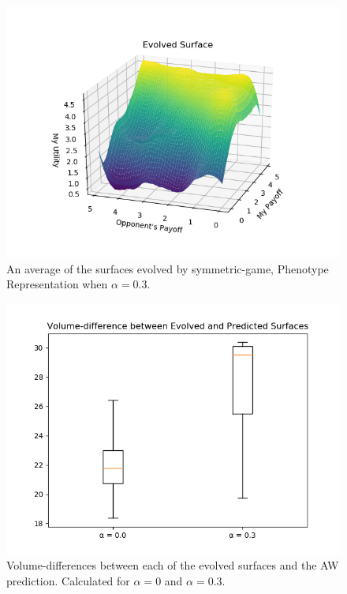 \documentclass[11pt]{book}
\begin{document}
\begin{figure}
	\centering
	\includegraphics[scale=0.7]{resources/average_r_03_symmetric_evolved.png}
	\caption{An average of the surfaces evolved by symmetric-game, Phenotype Representation when $\alpha = 0.3$.}
	\label{average_r_03_symmetric_evolved}
\end{figure}

\begin{figure}
	\centering
	\includegraphics[scale=0.6]{resources/distance_boxplot_r_00_03.png}
	\caption{Volume-differences between each of the evolved surfaces and the AW prediction. Calculated for $\alpha = 0$ and $\alpha = 0.3$.}
	\label{boxplot_volume_difference_symmetric}
\end{figure}
\end{document}
